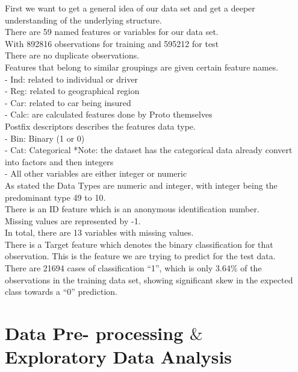 \documentclass[fleqn,10pt]{SelfArx} %
\begin{document}
First we want to get a general idea of our data set and get a deeper understanding of the underlying structure.\\
There are 59 named features or variables for our data set. \\
With 892816 observations for training and 595212 for test\\
There are no duplicate observations. \\
Features that belong to similar groupings are given certain feature names.\\
- Ind: related to individual or driver\\
- Reg: related to geographical region\\
- Car: related to car being insured\\
- Calc: are calculated features done by Proto themselves\\
Postfix descriptors describes the features data type.\\
- Bin: Binary (1 or 0)\\
- Cat: Categorical *Note: the dataset has the categorical data already convert into factors and then integers\\
- All other variables are either integer or numeric\\
As stated the Data Types are numeric and integer, with integer being the predominant type 49 to 10.\\
There is an ID feature which is an anonymous identification number.  \\
Missing values are represented by -1.\\
In total, there are 13 variables with missing values.\\
There is a Target feature which denotes the binary classification for that observation. This is the feature we are trying to predict for the test data.\\
There are 21694 cases of classification ``1'', which is only 3.64\% of the observations in the training data set, showing significant skew in the expected class towards a ``0'' prediction.\\
\bigskip
\bigskip


\section{Data Pre- processing $\&$ Exploratory Data Analysis} %
\end{document}
